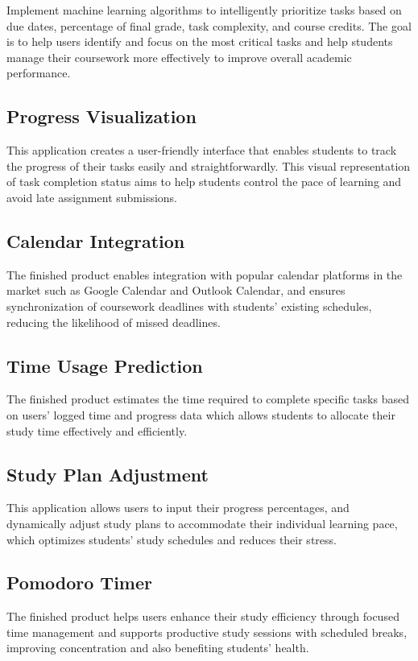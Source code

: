 \documentclass{article}
\begin{document}
    Implement machine learning algorithms to intelligently prioritize tasks based on due dates, percentage of final grade, task complexity, and course credits. The goal is to help users identify and focus on the most critical tasks and help students manage their coursework more effectively to improve overall academic performance.
    
    \subsection{Progress Visualization}
    This application creates a user-friendly interface that enables students to track the progress of their tasks easily and straightforwardly. This visual representation of task completion status aims to help students control the pace of learning and avoid late assignment submissions.
 
    \subsection{Calendar Integration}
    The finished product enables integration with popular calendar platforms in the market such as Google Calendar and Outlook Calendar, and ensures synchronization of coursework deadlines with students' existing schedules, reducing the likelihood of missed deadlines.
    
    \subsection{Time Usage Prediction}
    The finished product estimates the time required to complete specific tasks based on users' logged time and progress data which allows students to allocate their study time effectively and efficiently.

 
    \subsection{Study Plan Adjustment}
    This application allows users to input their progress percentages, and dynamically adjust study plans to accommodate their individual learning pace, which optimizes students' study schedules and reduces their stress.


    \subsection{Pomodoro Timer}
    The finished product helps users enhance their study efficiency through focused time management and supports productive study sessions with scheduled breaks, improving concentration and also benefiting students' health.
\end{document}
